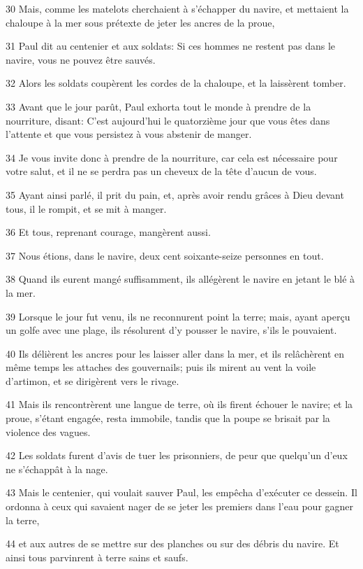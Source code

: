 \par 30 Mais, comme les matelots cherchaient à s'échapper du navire, et mettaient la chaloupe à la mer sous prétexte de jeter les ancres de la proue,
\par 31 Paul dit au centenier et aux soldats: Si ces hommes ne restent pas dans le navire, vous ne pouvez être sauvés.
\par 32 Alors les soldats coupèrent les cordes de la chaloupe, et la laissèrent tomber.
\par 33 Avant que le jour parût, Paul exhorta tout le monde à prendre de la nourriture, disant: C'est aujourd'hui le quatorzième jour que vous êtes dans l'attente et que vous persistez à vous abstenir de manger.
\par 34 Je vous invite donc à prendre de la nourriture, car cela est nécessaire pour votre salut, et il ne se perdra pas un cheveux de la tête d'aucun de vous.
\par 35 Ayant ainsi parlé, il prit du pain, et, après avoir rendu grâces à Dieu devant tous, il le rompit, et se mit à manger.
\par 36 Et tous, reprenant courage, mangèrent aussi.
\par 37 Nous étions, dans le navire, deux cent soixante-seize personnes en tout.
\par 38 Quand ils eurent mangé suffisamment, ils allégèrent le navire en jetant le blé à la mer.
\par 39 Lorsque le jour fut venu, ils ne reconnurent point la terre; mais, ayant aperçu un golfe avec une plage, ils résolurent d'y pousser le navire, s'ils le pouvaient.
\par 40 Ils délièrent les ancres pour les laisser aller dans la mer, et ils relâchèrent en même temps les attaches des gouvernails; puis ils mirent au vent la voile d'artimon, et se dirigèrent vers le rivage.
\par 41 Mais ils rencontrèrent une langue de terre, où ils firent échouer le navire; et la proue, s'étant engagée, resta immobile, tandis que la poupe se brisait par la violence des vagues.
\par 42 Les soldats furent d'avis de tuer les prisonniers, de peur que quelqu'un d'eux ne s'échappât à la nage.
\par 43 Mais le centenier, qui voulait sauver Paul, les empêcha d'exécuter ce dessein. Il ordonna à ceux qui savaient nager de se jeter les premiers dans l'eau pour gagner la terre,
\par 44 et aux autres de se mettre sur des planches ou sur des débris du navire. Et ainsi tous parvinrent à terre sains et saufs.

